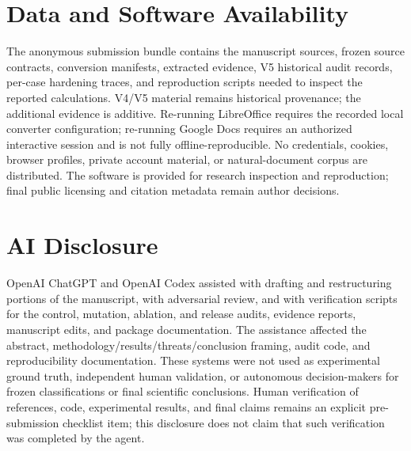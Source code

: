\documentclass[conference]{IEEEtran}
\begin{document}
\section*{Data and Software Availability}
The anonymous submission bundle contains the manuscript sources, frozen source contracts, conversion manifests, extracted evidence, V5 historical audit records, per-case hardening traces, and reproduction scripts needed to inspect the reported calculations. V4/V5 material remains historical provenance; the additional evidence is additive. Re-running LibreOffice requires the recorded local converter configuration; re-running Google Docs requires an authorized interactive session and is not fully offline-reproducible. No credentials, cookies, browser profiles, private account material, or natural-document corpus are distributed. The software is provided for research inspection and reproduction; final public licensing and citation metadata remain author decisions.

\section*{AI Disclosure}
OpenAI ChatGPT and OpenAI Codex assisted with drafting and restructuring portions of the manuscript, with adversarial review, and with verification scripts for the control, mutation, ablation, and release audits, evidence reports, manuscript edits, and package documentation. The assistance affected the abstract, methodology/results/threats/conclusion framing, audit code, and reproducibility documentation. These systems were not used as experimental ground truth, independent human validation, or autonomous decision-makers for frozen classifications or final scientific conclusions. Human verification of references, code, experimental results, and final claims remains an explicit pre-submission checklist item; this disclosure does not claim that such verification was completed by the agent.



\end{document}
